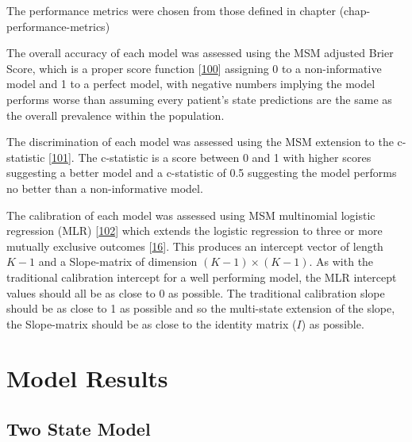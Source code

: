 \documentclass[12pt,PhD,twoside,openright]{muthesis}
\begin{document}
The performance metrics were chosen from those defined in chapter (chap-performance-metrics)

The overall accuracy of each model was assessed using the MSM adjusted Brier Score, which is a proper score function {[}\protect\hyperlink{ref-gneiting_strictly_2007}{100}{]} assigning 0 to a non-informative model and 1 to a perfect model, with negative numbers implying the model performs worse than assuming every patient's state predictions are the same as the overall prevalence within the population.

The discrimination of each model was assessed using the MSM extension to the c-statistic {[}\protect\hyperlink{ref-calster_extending_2012-1}{101}{]}. The c-statistic is a score between 0 and 1 with higher scores suggesting a better model and a c-statistic of 0.5 suggesting the model performs no better than a non-informative model.

The calibration of each model was assessed using MSM multinomial logistic regression (MLR) {[}\protect\hyperlink{ref-hoorde_assessing_2014}{102}{]} which extends the logistic regression to three or more mutually exclusive outcomes {[}\protect\hyperlink{ref-riley_prognosis_2019}{16}{]}. This produces an intercept vector of length \(K-1\) and a Slope-matrix of dimension \((K-1) \times (K-1)\). As with the traditional calibration intercept for a well performing model, the MLR intercept values should all be as close to 0 as possible. The traditional calibration slope should be as close to 1 as possible and so the multi-state extension of the slope, the Slope-matrix should be as close to the identity matrix (\(I\)) as possible.

\hypertarget{model-results}{%
\section{Model Results}\label{model-results}}

\hypertarget{two-state-model}{%
\subsection{Two State Model}\label{two-state-model}}
\end{document}
